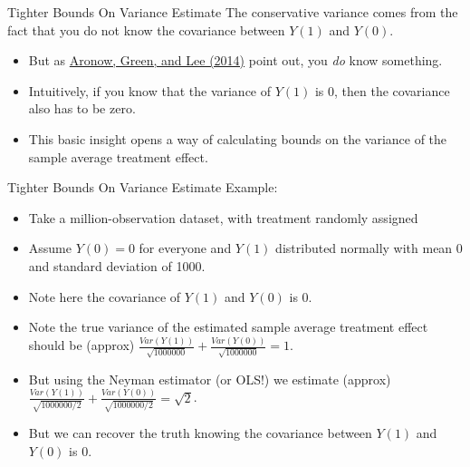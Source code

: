 \documentclass[
  11pt,
  ignorenonframetext,
]{beamer}
\providecommand{\tightlist}{%
  \setlength{\itemsep}{0pt}\setlength{\parskip}{0pt}}\usepackage{longtable,booktabs,array}
\begin{document}
\begin{frame}{Tighter Bounds On Variance Estimate}
\protect\hypertarget{tighter-bounds-on-variance-estimate}{}
The conservative variance comes from the fact that you do not know the
covariance between \(Y(1)\) and \(Y(0)\).

\begin{itemize}
\tightlist
\item
  But as
  \href{http://arxiv.org/pdf/1405.6555.pdf}{Aronow, Green, and Lee (2014)}
  point out, you \textit{do} know something.
\item
  Intuitively, if you know that the variance of \(Y(1)\) is 0, then the
  covariance also has to be zero.
\item
  This basic insight opens a way of calculating bounds on the variance
  of the sample average treatment effect.
\end{itemize}
\end{frame}

\begin{frame}{Tighter Bounds On Variance Estimate}
\protect\hypertarget{tighter-bounds-on-variance-estimate-1}{}
Example:

\begin{itemize}
\tightlist
\item
  Take a million-observation dataset, with treatment randomly assigned
\item
  Assume \(Y(0)=0\) for everyone and \(Y(1)\) distributed normally with
  mean 0 and standard deviation of 1000.
\item
  Note here the covariance of \(Y(1)\) and \(Y(0)\) is 0.
\item
  Note the true variance of the estimated sample average treatment
  effect should be (approx)
  \(\frac{Var(Y(1))}{\sqrt{1000000}} + \frac{Var(Y(0))}{\sqrt{1000000}} = 1\).
\item
  But using the Neyman estimator (or OLS!) we estimate (approx)
  \(\frac{Var(Y(1))}{\sqrt{1000000/2}} + \frac{Var(Y(0))}{\sqrt{1000000/2}} = \sqrt{2}\).
\item
  But we can recover the truth knowing the covariance between \(Y(1)\)
  and \(Y(0)\) is 0.
\end{itemize}
\end{frame}
\end{document}
